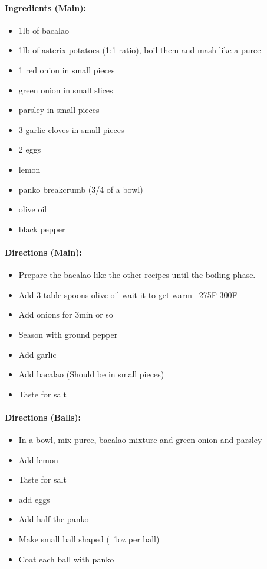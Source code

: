 \documentclass{article}
\begin{document}
\paragraph{Ingredients (Main):}
\begin{itemize}
    \item 1lb of bacalao
    \item 1lb of asterix potatoes (1:1 ratio), boil them and mash like a puree
    \item 1 red onion in small pieces
    \item green onion in small slices
    \item parsley in small pieces
    \item 3 garlic cloves in small pieces
    \item 2 eggs
    \item lemon
    \item panko breakcrumb (3/4 of a bowl)
    \item olive oil
    \item black pepper
\end{itemize}  

\paragraph{Directions (Main):}
\begin{itemize}
    \item Prepare the bacalao like the other recipes until the boiling phase.
    \item Add 3 table spoons olive oil wait it to get warm ~275F-300F
    \item Add onions for 3min or so
    \item Season with ground pepper
    \item Add garlic
    \item Add bacalao (Should be in small pieces)
    \item Taste for salt
\end{itemize}  

\paragraph{Directions (Balls):}
\begin{itemize}
    \item In a bowl, mix puree, bacalao mixture and green onion and parsley
    \item Add lemon
    \item Taste for salt
    \item add  eggs
    \item Add half the panko
    \item Make small ball shaped (~1oz per ball)
    \item Coat each ball with panko
\end{itemize}  
\end{document}
